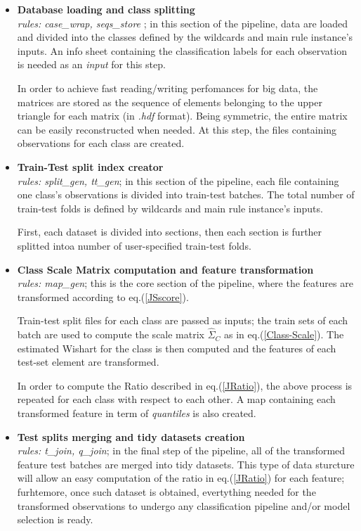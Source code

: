 \documentclass[12pt,openright,twoside,a4paper]{book}
\begin{document}
\begin{itemize}
\item \textbf{Database loading and class splitting}\\
\textit{rules: case\_wrap, seqs\_store} ; in this section of the pipeline, data are loaded and divided into the classes defined by the wildcards and main rule instance's inputs. An info sheet containing the classification labels for each observation is needed as an \textit{input} for this step. 

In order to achieve fast reading/writing perfomances for big data, the matrices are stored as the sequence of elements belonging to the upper triangle for each matrix (in \textit{.hdf} format). Being symmetric, the entire matrix can be easily reconstructed when needed. At this step, the files containing observations for each class are created.

\item \textbf{Train-Test split index creator}\\
\textit{rules: split\_gen, tt\_gen}; in this section of the pipeline, each file containing one class's observations is divided into train-test batches. The total number of train-test folds is defined by wildcards and main rule instance's inputs. 

First, each dataset is divided into sections, then each section is further splitted intoa number of user-specified  train-test folds.

\item \textbf{Class Scale Matrix computation and feature transformation}\\
\textit{rules: map\_gen}; this is the core section of the pipeline, where the features are transformed according to eq.(\ref{JSscore}).

Train-test split files for each class are passed as inputs; the train sets of each batch are used to compute the scale matrix $\hat{\Sigma}_C$ as in eq.(\ref{Class-Scale}). The estimated Wishart for the class is then computed and the features of each test-set element are transformed.

In order to compute the Ratio described in eq.(\ref{JRatio}), the above process is repeated for each class with respect to each other. A map containing each transformed feature in term of \textit{quantiles} is also created.

\item \textbf{Test splits merging and tidy datasets creation}\\
\textit{rules: t\_join, q\_join}; in the final step of the pipeline, all of the transformed feature test batches are merged into tidy datasets. This type of data sturcture will allow an easy computation of the ratio in eq.(\ref{JRatio}) for each feature; furhtemore, once such dataset is obtained, evertything needed for the transformed observations to undergo any classification pipeline and/or model selection is ready.
\end{itemize}
\end{document}
